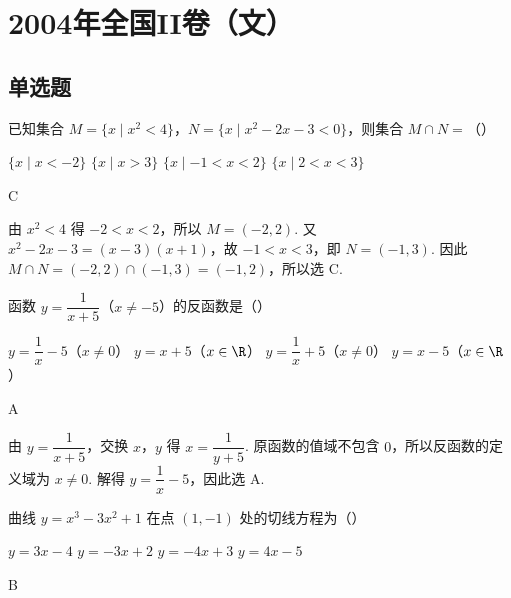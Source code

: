 \chapter{2004年全国II卷（文）}
\section{单选题}
\begin{problem}
已知集合 \(M = \{x \mid x^2 < 4\}\)，\(N = \{x \mid x^2 - 2x - 3 < 0\}\)，则集合 \(M \cap N =\)（\quad）

\choices
    {\(\{x \mid x < -2\}\)}
    {\(\{x \mid x > 3\}\)}
    {\(\{x \mid -1 < x < 2\}\)}
    {\(\{x \mid 2 < x < 3\}\)}
\end{problem}

\begin{answer}
C
\end{answer}

\begin{solution}
由 \(x^2<4\) 得 \(-2<x<2\)，所以 \(M=(-2,2)\). 又 \(x^2-2x-3=(x-3)(x+1)\)，故 \(-1<x<3\)，即 \(N=(-1,3)\). 因此 \(M\cap N=(-2,2)\cap(-1,3)=(-1,2)\)，所以选 C.
\end{solution}

\begin{problem}
函数 \(y=\dfrac{1}{x+5}\)（\(x\neq-5\)）的反函数是（\quad）

\choices
    {\(y=\dfrac{1}{x}-5\)（\(x\neq0\)）}
    {\(y=x+5\)（\(x\in\R\)）}
    {\(y=\dfrac{1}{x}+5\)（\(x\neq0\)）}
    {\(y=x-5\)（\(x\in\R\)）}
\end{problem}

\begin{answer}
A
\end{answer}

\begin{solution}
由 \(y=\dfrac{1}{x+5}\)，交换 \(x\)，\(y\) 得 \(x=\dfrac{1}{y+5}\). 原函数的值域不包含 \(0\)，所以反函数的定义域为 \(x\neq0\). 解得 \(y=\dfrac{1}{x}-5\)，因此选 A.
\end{solution}

\begin{problem}
曲线 \(y=x^3-3x^2+1\) 在点 \((1,-1)\) 处的切线方程为（\quad）

\choices
    {\(y=3x-4\)}
    {\(y=-3x+2\)}
    {\(y=-4x+3\)}
    {\(y=4x-5\)}
\end{problem}

\begin{answer}
B
\end{answer}

